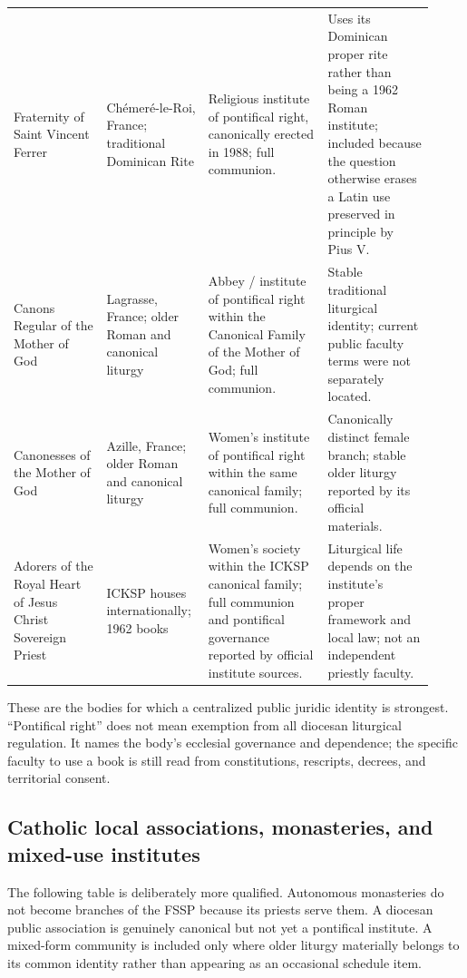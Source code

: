 \begin{longtable}{>{\bfseries\raggedright\arraybackslash}p{0.21\linewidth}>{\raggedright\arraybackslash}p{0.20\linewidth}>{\raggedright\arraybackslash}p{0.27\linewidth}>{\raggedright\arraybackslash}p{0.24\linewidth}}
Fraternity of Saint Vincent Ferrer & Chémeré-le-Roi, France; traditional Dominican Rite & Religious institute of pontifical right, canonically erected in 1988; full communion. & Uses its Dominican proper rite rather than being a 1962 Roman institute; included because the question otherwise erases a Latin use preserved in principle by Pius V.\\
Canons Regular of the Mother of God & Lagrasse, France; older Roman and canonical liturgy & Abbey / institute of pontifical right within the Canonical Family of the Mother of God; full communion. & Stable traditional liturgical identity; current public faculty terms were not separately located.\\
Canonesses of the Mother of God & Azille, France; older Roman and canonical liturgy & Women's institute of pontifical right within the same canonical family; full communion. & Canonically distinct female branch; stable older liturgy reported by its official materials.\\
Adorers of the Royal Heart of Jesus Christ Sovereign Priest & ICKSP houses internationally; 1962 books & Women's society within the ICKSP canonical family; full communion and pontifical governance reported by official institute sources. & Liturgical life depends on the institute's proper framework and local law; not an independent priestly faculty.\\
\bottomrule
\end{longtable}

These are the bodies for which a centralized public juridic identity is strongest. “Pontifical right” does not mean exemption from all diocesan liturgical regulation. It names the body's ecclesial governance and dependence; the specific faculty to use a book is still read from constitutions, rescripts, decrees, and territorial consent.

\subsection{Catholic local associations, monasteries, and mixed-use institutes}

The following table is deliberately more qualified. Autonomous monasteries do not become branches of the FSSP because its priests serve them. A diocesan public association is genuinely canonical but not yet a pontifical institute. A mixed-form community is included only where older liturgy materially belongs to its common identity rather than appearing as an occasional schedule item.

